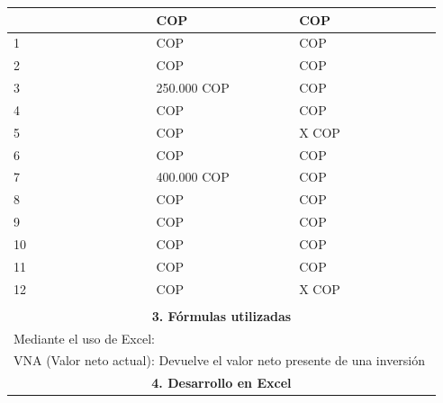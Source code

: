 \begin{center}
\begin{longtable}[H]{|p{0.333\linewidth}|p{0.3333\linewidth}|p{0.3333\linewidth}|}
{\begin{center}
\begin{tabular}{|p{4cm}|p{4cm}|p{4cm}|}
    0                &  COP                      &  COP                          \\ \hline
    1                &  COP                      &  COP                          \\ \hline
    2                &  COP                      &  COP                          \\ \hline
    3                &  250.000 COP              &  COP                          \\ \hline
    4                &  COP                      &  COP                          \\ \hline
    5                &  COP                      &  X COP                        \\ \hline
    6                &  COP                      &  COP                          \\ \hline
    7                &  400.000 COP              &  COP                          \\ \hline
    8                &  COP                      &  COP                          \\ \hline
    9                &  COP                      &  COP                          \\ \hline
    10               &  COP                      &  COP                          \\ \hline
    11               &  COP                      &  COP                          \\ \hline
    12               &  COP                      &  X COP                        \\ \hline
   \end{tabular}
  \end{center}
  }                                                                                                           \\ \hline
  \multicolumn{3}{|c|}{\cellcolor[HTML]{FFB183}\textbf{3. Fórmulas utilizadas}}                               \\ \hline
  \multicolumn{3}{|l|}{Mediante el uso de Excel:}                                                             \\
  \multicolumn{3}{|l|}{VNA (Valor neto actual): Devuelve el valor neto presente de una inversión}                      \\ \hline
  \multicolumn{3}{|c|}{\cellcolor[HTML]{FFB183}\textbf{4. Desarrollo en Excel}}                               \\ \hline

\end{longtable}
\end{center}
